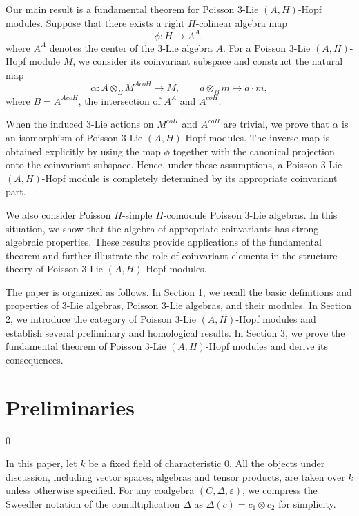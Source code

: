 \documentclass[11pt]{article}
\begin{document}
Our main result is a fundamental theorem for Poisson 3-Lie $(A,H)$-Hopf modules. Suppose that there exists a right $H$-colinear algebra map
$$\phi:H\rightarrow A^A,$$
where $A^A$ denotes the center of the 3-Lie algebra $A$. For a Poisson 3-Lie $(A,H)$-Hopf module $M$, we consider its coinvariant subspace and construct the natural map
$$\alpha:A\otimes_B M^{AcoH}\rightarrow M, \qquad a\otimes_Bm\mapsto a\cdot m,$$
where $B=A^{AcoH}$, the intersection of $A^A$ and $A^{coH}$. 

When the induced 3-Lie actions on $M^{coH}$ and $A^{coH}$ are trivial, we prove that $\alpha$ is an isomorphism of Poisson 3-Lie $(A,H)$-Hopf modules. The inverse map is obtained explicitly by using the map $\phi$ together with the canonical projection onto the coinvariant subspace. Hence, under these assumptions, a Poisson 3-Lie $(A,H)$-Hopf module is completely determined by its appropriate coinvariant part.

We also consider Poisson $H$-simple $H$-comodule Poisson 3-Lie algebras. In this situation, we show that the algebra of appropriate coinvariants has strong algebraic properties. These results provide applications of the fundamental theorem and further illustrate the role of coinvariant elements in the structure theory of Poisson 3-Lie $(A,H)$-Hopf modules.

The paper is organized as follows. In Section 1, we recall the basic definitions and properties of 3-Lie algebras, Poisson 3-Lie algebras, and their modules. In Section 2, we introduce the category of Poisson 3-Lie $(A,H)$-Hopf modules and establish several preliminary and homological results. In Section 3, we prove the fundamental theorem of Poisson 3-Lie $(A,H)$-Hopf modules and derive its consequences.

\vspace{2mm}

\noindent




\section{Preliminaries}
\def\theequation{1.\arabic{equation}}
\setcounter{equation} {0}

In this paper, let $k$ be a fixed field of characteristic 0. All the objects under discussion, including vector spaces, algebras and tensor products, are taken over $k$ unless otherwise specified.
For any coalgebra $(C,\Delta,\varepsilon)$, we compress the Sweedler notation of the comultiplication $\Delta$ as $\Delta(c)=c_1\otimes c_2$ for simplicity.
\end{document}
